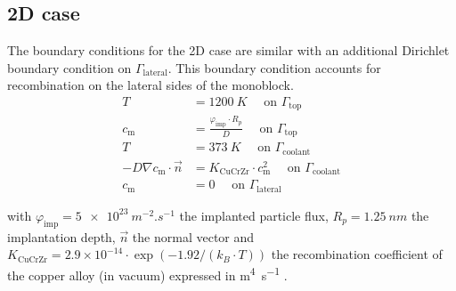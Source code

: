 \subsection{2D case}
The boundary conditions for the 2D case are similar with an additional Dirichlet boundary condition on $\Gamma_\mathrm{lateral}$.
This boundary condition accounts for recombination on the lateral sides of the monoblock.
\begin{subequations}
    \begin{align}
        T &=  \SI{1200}{K}\quad \text { on } \Gamma_\mathrm{top}\\
        c_\mathrm{m} &=  \frac{\varphi_\mathrm{imp} \cdot R_p}{D}\quad \text { on } \Gamma_\mathrm{top}\\
        T &= \SI{373}{K}\quad \text { on } \Gamma_\mathrm{coolant}\\
        -D \nabla c_\mathrm{m} \cdot \vec{n} &= K_\mathrm{CuCrZr} \cdot c_\mathrm{m}^{2} \quad \text { on } \Gamma_\mathrm{coolant} \\
        c_\mathrm{m} &= 0 \quad \text { on } \Gamma_\mathrm{lateral}
    \end{align}
\end{subequations}

with $\varphi_\mathrm{imp} = \SI{5e23}{m^{-2}.s^{-1}}$ the implanted particle flux, $R_p = \SI{1.25}{nm}$ the implantation depth, $\vec{n}$ the normal vector and $K_\mathrm{CuCrZr} = 2.9 \times 10^{-14}\cdot \exp{(-1.92/(k_B\cdot T))}$ the recombination coefficient of the copper alloy (in vacuum) expressed in \si{m^4.s^{-1}} .


